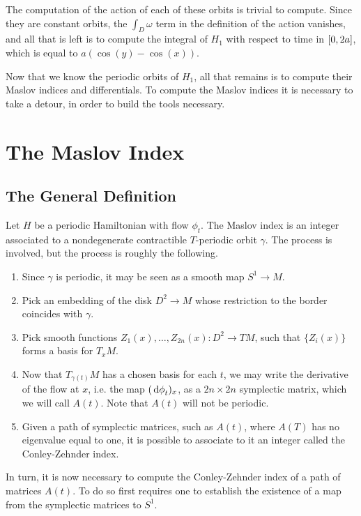 \documentclass{article}
\theoremstyle{nonumberplain}
\begin{document}
The computation of the action of each of these orbits is trivial to compute. Since they are constant orbits, the $\int_D \omega$ term in the definition of the action vanishes, and all that is left is to compute the integral of $H_1$ with respect to time in $\interval 0 {2a}$, which is equal to $a(\cos(y) - \cos(x))$.

Now that we know the periodic orbits of $H_1$, all that remains is to compute their Maslov indices and differentials. To compute the Maslov indices it is necessary to take a detour, in order to build the tools necessary.

\section{The Maslov Index}

\subsection{The General Definition}

Let $H$ be a periodic Hamiltonian with flow $\phi_t$. The Maslov index is an integer associated to a nondegenerate contractible $T$-periodic orbit $\gamma$. The process is involved, but the process is roughly the following.
\begin{enumerate}[algorithm]\label{page:maslovalg}
\item\label{maslovalg:step1} Since $\gamma$ is periodic, it may be seen as a smooth map $S^1 \to M$.
\item Pick an embedding of the disk $D^2 \to M$ whose restriction to the border coincides with $\gamma$.
\item Pick smooth functions $Z_1(x), \dots, Z_{2n}(x) \colon D^2 \to TM$, such that $\{Z_i(x)\}$ forms a basis for $T_x M$.
\item Now that $T_{\gamma(t)} M$ has a chosen basis for each $t$, we may write the derivative of the flow at $x$, i.e. the map $(\dl \phi_t)_x$, as a $2n \times 2n$ symplectic matrix, which we will call $A(t)$. Note that $A(t)$ will not be periodic.
\item\label{maslovalg:step5} Given a path of symplectic matrices, such as $A(t)$, where $A(T)$ has no eigenvalue equal to one, it is possible to associate to it an integer called the Conley-Zehnder index.
\end{enumerate}

In turn, it is now necessary to compute the Conley-Zehnder index of a path of matrices $A(t)$. To do so first requires one to establish the existence of a map from the symplectic matrices to $S^1$.
\end{document}
